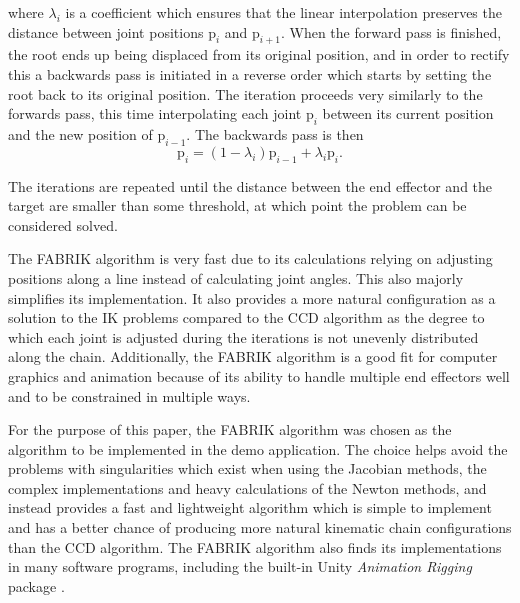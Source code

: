 \noindent where \(\lambda_i\) is a coefficient which ensures that the linear interpolation
preserves the distance between joint positions \(\mbox{p}_i\) and
\(\mbox{p}_{i+1}\). When the forward pass is finished, the root ends up being
displaced from its original position, and in order to rectify this a backwards
pass is initiated in a reverse order which starts by setting the root back to
its original position. The iteration proceeds very similarly to the forwards
pass, this time interpolating each joint \(\mbox{p}_i\) between its current
position and the new position of \(\mbox{p}_{i-1}\). The backwards pass is then
\begin{equation}
    \mbox{p}_i = (1 - \lambda_i)\mbox{p}_{i-1} + \lambda_i \mbox{p}_i.
\end{equation}

The iterations are repeated until the distance between the end effector and the
target are smaller than some threshold, at which point the problem can be
considered solved.

The FABRIK algorithm is very fast due to its calculations relying on adjusting
positions along a line instead of calculating joint angles. This also majorly
simplifies its implementation. It also provides a more natural configuration as
a solution to the IK problems compared to the CCD algorithm as the degree to
which each joint is adjusted during the iterations is not unevenly distributed
along the chain. Additionally, the FABRIK algorithm is a good fit for computer
graphics and animation because of its ability to handle multiple end effectors
well and to be constrained in multiple ways.

For the purpose of this paper, the FABRIK algorithm was chosen as the
algorithm to be implemented in the demo application. The choice helps avoid the
problems with singularities which exist when using the Jacobian methods, the
complex implementations and heavy calculations of the Newton methods, and
instead provides a fast and lightweight algorithm which is simple to implement
and has a better chance of producing more natural kinematic chain configurations
than the CCD algorithm. The FABRIK algorithm also finds its implementations in
many software programs, including the built-in Unity \textit{Animation Rigging}
package \cite{unity_animation_rigging}.

